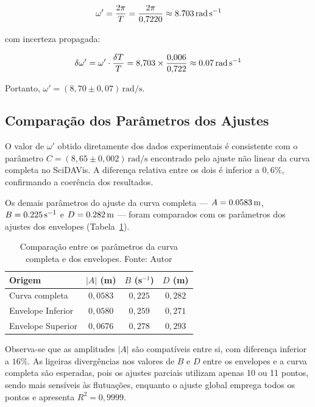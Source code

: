 \documentclass[12pt,a4paper]{article}
\begin{document}
\begin{equation}
    \omega' = \frac{2\pi}{T} = \frac{2\pi}{0{,}7220} \approx \SI{8{,}703}{\radian\per\second}
\end{equation}

com incerteza propagada:

\begin{equation}
    \delta\omega' = \omega' \cdot \frac{\delta T}{T} = 8{,}703 \times \frac{0{,}006}{0{,}722} \approx \SI{0{,}07}{\radian\per\second}
\end{equation}

Portanto, $\omega' = (8{,}70 \pm 0{,}07)\,\si{\radian\per\second}$.

\subsection{Comparação dos Parâmetros dos Ajustes}

O valor de $\omega'$ obtido diretamente dos dados experimentais é consistente com o parâmetro $C = (8{,}65 \pm 0{,}002)\,\si{\radian\per\second}$ encontrado pelo ajuste não linear da curva completa no SciDAVis. A diferença relativa entre os dois é inferior a $0{,}6\%$, confirmando a coerência dos resultados.

Os demais parâmetros do ajuste da curva completa — $A = \SI{0{,}0583}{\meter}$, $B = \SI{0{,}225}{\per\second}$ e $D = \SI{0{,}282}{\meter}$ — foram comparados com os parâmetros dos ajustes dos envelopes (Tabela~\ref{tab:comparacao_parametros}).

\begin{table}[H]
    \centering
    \caption{Comparação entre os parâmetros da curva completa e dos envelopes. Fonte: Autor}
    \label{tab:comparacao_parametros}
    \begin{tabular}{lccc}
        \toprule
        \textbf{Origem} & $|A|$ (m) & $B$ (s$^{-1}$) & $D$ (m) \\
        \midrule
        Curva completa  & $0{,}0583$ & $0{,}225$ & $0{,}282$ \\
        Envelope Inferior & $0{,}0580$ & $0{,}259$ & $0{,}271$ \\
        Envelope Superior & $0{,}0676$ & $0{,}278$ & $0{,}293$ \\
        \bottomrule
    \end{tabular}
\end{table}

Observa-se que as amplitudes $|A|$ são compatíveis entre si, com diferença inferior a $16\%$. As ligeiras divergências nos valores de $B$ e $D$ entre os envelopes e a curva completa são esperadas, pois os ajustes parciais utilizam apenas 10 ou 11 pontos, sendo mais sensíveis às flutuações, enquanto o ajuste global emprega todos os pontos e apresenta $R^2 = 0{,}9999$.
\end{document}
